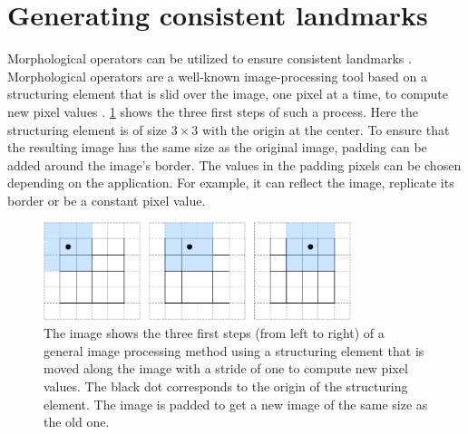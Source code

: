 \section{Generating consistent landmarks}

Morphological operators can be utilized to ensure consistent landmarks \cite{Yuan2016AnNavigation}. Morphological operators are a well-known image-processing tool based on a structuring element that is slid over the image, one pixel at a time, to compute new pixel values \cite{Gonzalez2018DigitalProcessing}. \cref{fig:image_processing_basics} shows the three first steps of such a process. Here the structuring element is of size $3\times3$ with the origin at the center. To ensure that the resulting image has the same size as the original image, padding can be added around the image's border. The values in the padding pixels can be chosen depending on the application. For example, it can reflect the image, replicate its border or be a constant pixel value.  

\begin{figure}
    \centering
    \includegraphics[width=0.8\textwidth]{figures/Image_processing_essentials.drawio.pdf}
    \caption{The image shows the three first steps (from left to right) of a general image processing method using a structuring element that is moved along the image with a stride of one to compute new pixel values. The black dot corresponds to the origin of the structuring element. The image is padded to get a new image of the same size as the old one.}
    \label{fig:image_processing_basics}
\end{figure}


